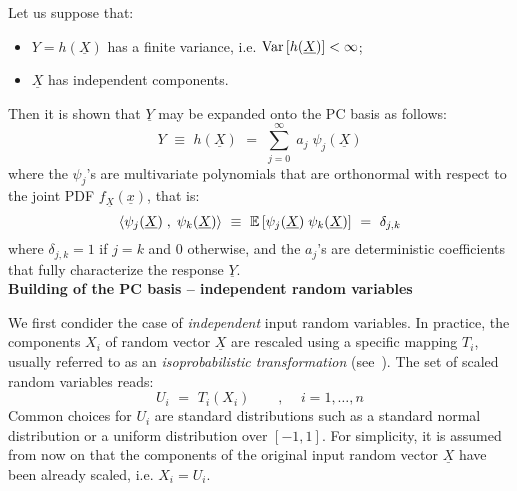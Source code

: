 {  Let us suppose that:
  \begin{itemize}
  \item $Y = h(\underline{X})$ has a finite variance, i.e. ${\rm Var}\left[ h(\underline{X}) \right] < \infty$;
  \item $\underline{X}$ has independent components.
  \end{itemize}
  Then it is shown that $\underline{Y}$ may be expanded onto the PC basis as follows:
  \begin{equation} \label{eq:PC}
    Y \, \,  \equiv \, \,  h(\underline{X}) \, \, = \, \, \sum_{j=0}^{\infty} \; a_{j} \; \psi_{j}(\underline{X})
  \end{equation}
  where the $\psi_{j}$'s are multivariate polynomials that are orthonormal with respect to the joint PDF $f_{\underline{X}}(\underline{x})$, that is:
  \begin{equation}
    \langle \psi_{j}(\underline{X}) \; , \; \psi_{k}(\underline{X}) \rangle \, \, \equiv \, \, {\mathbb E}\left[ \psi_{j}(\underline{X}) \; \psi_{k}(\underline{X}) \right] \, \, = \, \, \delta_{j,k}
  \end{equation}
  where $\delta_{j,k} = 1$ if $j=k$ and 0 otherwise, and the $a_{j}$'s are deterministic coefficients that fully characterize the response $\underline{Y}$. \\







  \textbf{Building of the PC basis -- independent random variables} \vspace{2mm}

  We first condider the case of \emph{independent} input random variables. In practice, the components $X_i$ of random vector $\underline{X}$ are rescaled using a specific mapping $T_i$, usually referred to as an \emph{isoprobabilistic transformation} (see~). The set of scaled random variables reads:
  \begin{equation} \label{eq:PC_isotransfo}
    U_i \, \, = \, \, T_i(X_i) \quad \quad , \quad \, i=1,\dots,n
  \end{equation}
  Common choices for $U_i$ are standard distributions such as a standard normal distribution or a uniform distribution over $[-1,1]$. For simplicity, it is assumed from now on that the components of the original input random vector $\underline{X}$ have been already scaled, i.e. $X_i = U_i$. \\

}
